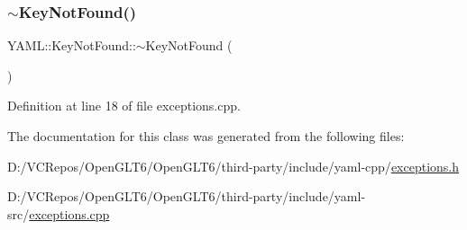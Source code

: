 \mbox{\label{class_y_a_m_l_1_1_key_not_found_ab802ac941e3b82499424c4d81cecab4d}} 
\subsubsection{\texorpdfstring{$\sim$KeyNotFound()}{~KeyNotFound()}}
{\footnotesize\ttfamily Y\+A\+M\+L\+::\+Key\+Not\+Found\+::$\sim$\+Key\+Not\+Found (\begin{DoxyParamCaption}{ }\end{DoxyParamCaption})\hspace{0.3cm}{\ttfamily [virtual]}}



Definition at line 18 of file exceptions.\+cpp.



The documentation for this class was generated from the following files\+:\begin{DoxyCompactItemize}
\item 
D\+:/\+V\+C\+Repos/\+Open\+G\+L\+T6/\+Open\+G\+L\+T6/third-\/party/include/yaml-\/cpp/\mbox{\hyperlink{exceptions_8h}{exceptions.\+h}}\item 
D\+:/\+V\+C\+Repos/\+Open\+G\+L\+T6/\+Open\+G\+L\+T6/third-\/party/include/yaml-\/src/\mbox{\hyperlink{exceptions_8cpp}{exceptions.\+cpp}}\end{DoxyCompactItemize}
